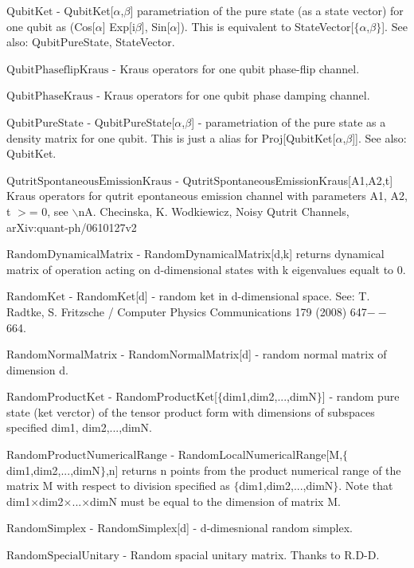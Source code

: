 \documentclass[a4paper,12pt]{article}
\begin{document}
\textbf{$ \text{QubitKet} $ } - QubitKet[$\alpha $,$\beta $] parametriation of the pure state (as a state vector) for one qubit as (Cos[$\alpha $] Exp[i$\beta $], Sin[$\alpha $]). This is equivalent to StateVector[$\{\alpha $,$\beta \}$]. See also: QubitPureState, StateVector.$  $

\textbf{$ \text{QubitPhaseflipKraus} $ } - Kraus operators for one qubit phase-flip channel.$  $

\textbf{$ \text{QubitPhaseKraus} $ } - Kraus operators for one qubit phase damping channel.$  $

\textbf{$ \text{QubitPureState} $ } - QubitPureState[$\alpha $,$\beta $] - parametriation of the pure state as a density matrix for one qubit. This is just a alias for Proj[QubitKet[$\alpha $,$\beta $]]. See also: QubitKet.$  $

\textbf{$ \text{QutritSpontaneousEmissionKraus} $ } - QutritSpontaneousEmissionKraus[A1,A2,t] Kraus operators for qutrit epontaneous emission channel with parameters A1, A2, t $>$= 0, see $\backslash $nA. Checinska, K. Wodkiewicz, Noisy Qutrit Channels, arXiv:quant-ph/0610127v2$  $

\textbf{$ \text{RandomDynamicalMatrix} $ } - RandomDynamicalMatrix[d,k] returns dynamical matrix of operation acting on d-dimensional states with k eigenvalues equalt to 0.$  $

\textbf{$ \text{RandomKet} $ } - RandomKet[d] - random ket in d-dimensional space. See: T. Radtke, S. Fritzsche / Computer Physics Communications 179 (2008) 647$--$664.$  $

\textbf{$ \text{RandomNormalMatrix} $ } - RandomNormalMatrix[d] - random normal matrix of dimension d.$  $

\textbf{$ \text{RandomProductKet} $ } - RandomProductKet[$\{$dim1,dim2,...,dimN$\}$] - random pure state (ket verctor) of the tensor product form with dimensions of subspaces specified dim1, dim2,...,dimN.$  $

\textbf{$ \text{RandomProductNumericalRange} $ } - RandomLocalNumericalRange[M,$\{$dim1,dim2,...,dimN$\}$,n] returns n points from the product numerical range of the matrix M with respect to division specified as $\{$dim1,dim2,...,dimN$\}$. Note that dim1$\times $dim2$\times $...$\times $dimN must be equal to the dimension of matrix M.$  $

\textbf{$ \text{RandomSimplex} $ } - RandomSimplex[d] - d-dimesnional random simplex.$  $

\textbf{$ \text{RandomSpecialUnitary} $ } - Random spacial unitary matrix. Thanks to R.D-D.$  $
\end{document}
